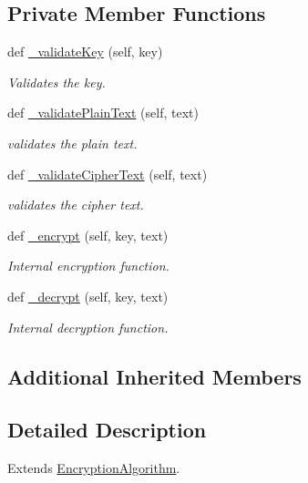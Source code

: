 \subsection*{Private Member Functions}
\begin{DoxyCompactItemize}
\item 
def \mbox{\hyperlink{classEncryptionAlgorithms_1_1HillCipher_adcc154da68ea72b40661bbc12315604f}{\+\_\+validate\+Key}} (self, key)
\begin{DoxyCompactList}\small\item\em Validates the key. \end{DoxyCompactList}\item 
def \mbox{\hyperlink{classEncryptionAlgorithms_1_1HillCipher_a3a9607e614402c2d7daa85d074b44a05}{\+\_\+validate\+Plain\+Text}} (self, text)
\begin{DoxyCompactList}\small\item\em validates the plain text. \end{DoxyCompactList}\item 
def \mbox{\hyperlink{classEncryptionAlgorithms_1_1HillCipher_ada1350994864531981e9d6d67f64e99c}{\+\_\+validate\+Cipher\+Text}} (self, text)
\begin{DoxyCompactList}\small\item\em validates the cipher text. \end{DoxyCompactList}\item 
def \mbox{\hyperlink{classEncryptionAlgorithms_1_1HillCipher_a68387a2463c5fc0d3753cf49a3c93d3b}{\+\_\+encrypt}} (self, key, text)
\begin{DoxyCompactList}\small\item\em Internal encryption function. \end{DoxyCompactList}\item 
def \mbox{\hyperlink{classEncryptionAlgorithms_1_1HillCipher_a35c4b5497e9a1a3e080dd8c4606f0003}{\+\_\+decrypt}} (self, key, text)
\begin{DoxyCompactList}\small\item\em Internal decryption function. \end{DoxyCompactList}\end{DoxyCompactItemize}
\subsection*{Additional Inherited Members}


\subsection{Detailed Description}
Extends \mbox{\hyperlink{classEncryptionAlgorithms_1_1EncryptionAlgorithm}{Encryption\+Algorithm}}. 

